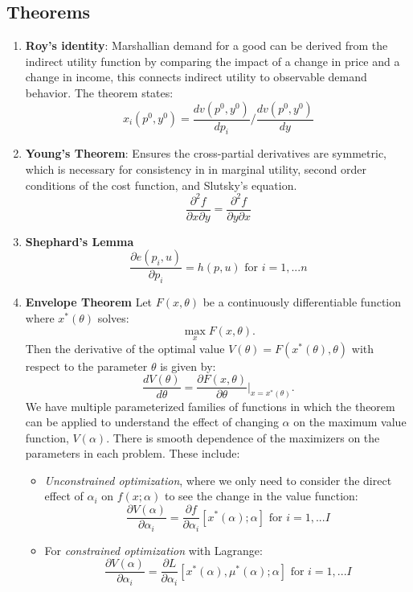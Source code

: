 \documentclass{article}
\begin{document}
\subsection{Theorems}
\begin{enumerate}
    \item \textbf{Roy's identity}\label{roy}: Marshallian demand for a good can be derived from the indirect utility function by comparing the impact of a change in price and a change in income, this connects indirect utility to observable demand behavior. The theorem states:
    \[
    x_i(p^0,y^0) = \frac{dv(p^0,y^0)}{dp_{i}} \Big/ \frac{dv(p^0,y^0)}{dy}
    \]
    \item \textbf{Young's Theorem}\label{YT}: Ensures the cross-partial derivatives are symmetric, which is necessary for consistency in in marginal utility, second order conditions of the cost function, and Slutsky's equation. 
    \[
    \frac{\partial^2f}{\partial x\partial y} = \frac{\partial^2f}{\partial y\partial x}
    \]
    \item \textbf{Shephard's Lemma}\label{SL}
    \[
    \frac{\partial e(p_i,u)}{\partial p_i} = h(p,u) \text{ for } i = 1,...n
    \]
    \item \textbf{Envelope Theorem}\label{ET}
    Let \( F(x, \theta) \) be a continuously differentiable function where \( x^*(\theta) \) solves:
        \[
        \max_{x} F(x, \theta).
        \]
        Then the derivative of the optimal value \( V(\theta) = F(x^*(\theta), \theta) \) with respect to the parameter \( \theta \) is given by:
        \[
        \frac{dV(\theta)}{d\theta} = \frac{\partial F(x, \theta)}{\partial \theta} \Bigg|_{x = x^*(\theta)}.
        \]
        We have multiple parameterized families of functions in which the theorem can be applied to understand the effect of changing $\alpha$ on the maximum value function, $V(\alpha)$. There is smooth dependence of the maximizers on the parameters in each problem. These include:
        \begin{itemize}
            \item \textit{Unconstrained optimization}, where we only need to consider the direct effect of $\alpha_i$ on $f(x;\alpha)$ to see the change in the value function: 
            \[
            \frac{\partial V(\alpha)}{\partial \alpha_i} = \frac{\partial f}{\partial \alpha_i}[x^*(\alpha);\alpha] \text{ for } i = 1,...I
            \] 
            \item For \textit{constrained optimization} with Lagrange:
            \[
            \frac{\partial V(\alpha)}{\partial \alpha_i} = \frac{\partial L}{\partial \alpha_i}[x^*(\alpha), \mu^*(\alpha); \alpha] \text{ for } i = 1,...I
\]
\end{itemize}
\end{enumerate}
\end{document}
